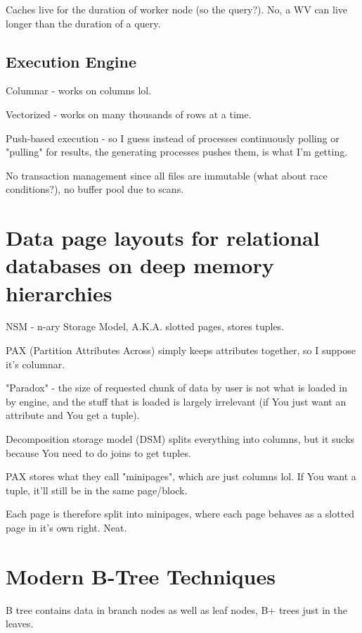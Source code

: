 \documentclass{article}
\begin{document}
		Caches live for the duration of worker node (so the query?). No, a WV can live longer than the duration of a query.
		
	\subsection{Execution Engine}
	
		Columnar - works on columns lol.
		
		Vectorized - works on many thousands of rows at a time.
		
		Push-based execution - so I guess instead of processes continuously polling or "pulling" for results, the generating processes pushes them, is what I'm getting.
		
		No transaction management since all files are immutable (what about race conditions?), no buffer pool due to scans.
	
	
			
\newpage
\section{Data page layouts for relational databases on deep memory hierarchies}

	NSM - n-ary Storage Model, A.K.A. slotted pages, stores tuples.
	
	PAX (Partition Attributes Across) simply keeps attributes together, so I suppose it's columnar.
	
	"Paradox" - the size of requested chunk of data by user is not what is loaded in by engine, and the stuff that is loaded is largely irrelevant (if You just want an attribute and You get a tuple).
	
	Decomposition storage model (DSM) splits everything into columns, but it sucks because You need to do joins to get tuples.
	
	PAX stores what they call "minipages", which are just columns lol. If You want a tuple, it'll still be in the same page/block.
	
	Each page is therefore split into minipages, where each page behaves as a slotted page in it's own right. Neat.
	
\newpage
\section{Modern B-Tree Techniques}

	B tree contains data in branch nodes as well as leaf nodes, B+ trees just in the leaves.
	
\end{document}
